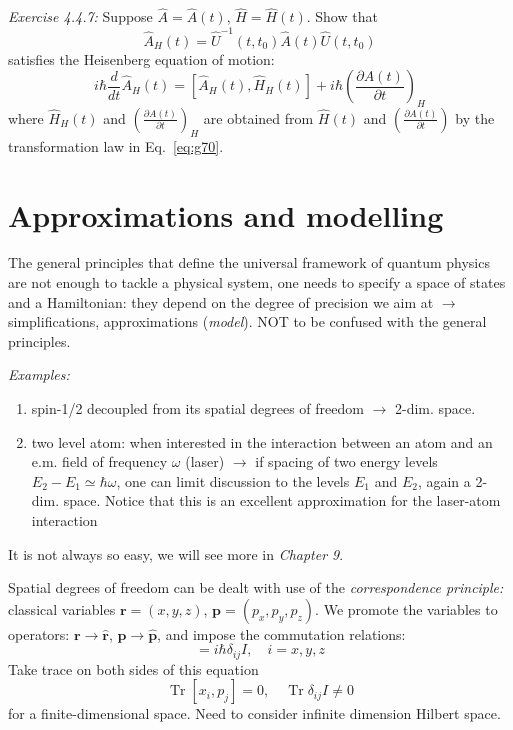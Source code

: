 \documentclass[12pt]{article}
\newcommand{\be}{\begin{equation}}
\newcommand{\ee}{\end{equation}}
\begin{document}
\emph{Exercise 4.4.7:} Suppose $\hat{A} = \hat{A}(t)$, $\hat{H} = \hat{H}(t)$.
Show that
\be
\hat{A}_{H}(t)=\hat{U}^{-1}\left(t, t_{0}\right) \hat{A}(t) \hat{U}\left(t, t_{0}\right)
\label{eq:g70}
\ee
satisfies the Heisenberg equation of motion:
\be
i \hbar \frac{d}{d t} \hat{A}_{H}(t)=\left[\hat{A}_{H}(t), \hat{H}_{H}(t)\right]+i \hbar\left(\frac{\partial A(t)}{\partial t}\right)_{H}
\ee
where $\hat{H}_{H}(t)$ and $\left(\frac{\partial A(t)}{\partial t}\right)_{H}$ are obtained 
from $\hat{H}(t)$ and $\left(\frac{\partial A(t)}{\partial t}\right)$ by the transformation
law in Eq.~\ref{eq:g70}.


\section{Approximations and modelling} 

The general principles that define the universal
framework of quantum physics
are not enough to tackle
a physical system, one needs to
specify a space of states and a
Hamiltonian: they depend on the
degree of precision we aim at
$\to$ simplifications, approximations (\emph{model}).
NOT to be confused with the general principles.

\emph{Examples:}
 
\begin{enumerate}
\item spin-1/2 decoupled from its spatial
degrees of freedom $\to$ 2-dim. space.
\item two level atom: when interested in
the interaction between an atom and
an e.m. field of frequency $\omega$ (laser)
$\to$ if spacing of two energy levels 
$E_2-E_1 \simeq \hbar \omega$, one can limit
discussion to the levels $E_1$ and $E_2$,
again a 2-dim. space.
Notice that this is an excellent approximation 
for the laser-atom interaction
\end{enumerate}


It is not always so easy, we will see more in \emph{Chapter 9}.

Spatial degrees of freedom can be dealt with
use of the \emph{correspondence principle:}
classical variables $\mathbf{r} = (x,y,z)$, $\mathbf{p} = (p_x,p_y,p_z)$.
We promote the variables to operators:
$\mathbf{r} \to \hat{\mathbf{r}}$,
$\mathbf{p} \to \hat{\mathbf{p}}$,
and impose the commutation relations:
\be
[x_i,p_j] = i\hbar \delta_{ij}I,\quad i=x,y,z
\ee
Take trace on both sides of this equation
\[
\operatorname{Tr}\left[x_{i}, p_{j}\right]=0,\quad \operatorname{Tr} \delta_{i j} I \neq 0
\]
for a finite-dimensional space.
Need to consider infinite dimension Hilbert space.
\end{document}
